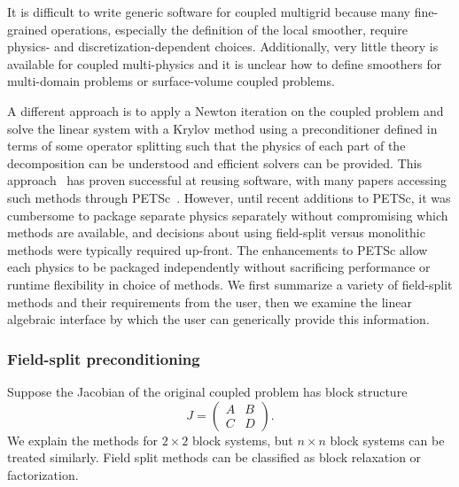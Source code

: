 It is difficult to write generic software for coupled multigrid because many fine-grained operations, especially the definition of the local smoother, require physics- and discretization-dependent choices.
Additionally, very little theory is available for coupled multi-physics and it is unclear how to define smoothers for multi-domain problems or surface-volume coupled problems.

A different approach is to apply a Newton iteration on the coupled problem and solve the linear system with a Krylov method using a preconditioner defined in terms of some operator splitting such that the physics of each part of the decomposition can be understood and efficient solvers can be provided.
This approach~\cite{knoll2004jfn} has proven successful at reusing software, with many papers accessing such methods through PETSc~\cite{petsc-web-page}.
However, until recent additions to PETSc, it was cumbersome to package separate physics separately without compromising which methods are available, and decisions about using field-split versus monolithic methods were typically required up-front.
The enhancements to PETSc allow each physics to be packaged independently without sacrificing performance or runtime flexibility in choice of methods.
We first summarize a variety of field-split methods and their requirements from the user, then we examine the linear algebraic interface by which the user can generically provide this information.

\subsubsection{Field-split preconditioning}
Suppose the Jacobian of the original coupled problem has block structure
\begin{equation}\label{eq:fieldsplit:jacobian}
  J = \begin{pmatrix} A & B \\ C & D \end{pmatrix} .
\end{equation}
We explain the methods for $2\times 2$ block systems, but $n\times n$ block systems can be treated similarly.
Field split methods can be classified as block relaxation or factorization.

